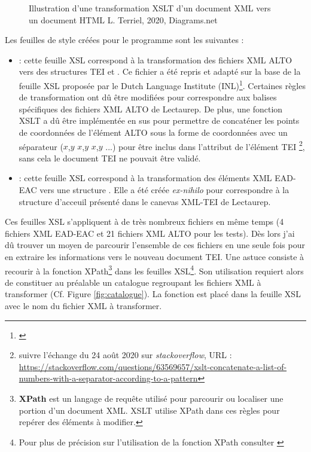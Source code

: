 \begin{figure}[h!]
    \centering
    \centerline{}
    \caption{Illustration d'une transformation XSLT d'un document XML vers un document HTML  \textcopyright L. Terriel, 2020, Diagrams.net}
    \label{fig:example_XSLT}
\end{figure}
\newpage
Les feuilles de style créées pour le programme sont les suivantes : 
\begin{itemize}
    \item {} : cette feuille XSL correspond à la transformation des fichiers XML ALTO vers des structures TEI  et . Ce fichier a été repris et adapté sur la base de la feuille XSL proposée par le Dutch Language Institute (INL)\footnote{\cite{dutch_language_institute_alto2tei_nodate}}. Certaines règles de transformation ont dû être modifiées pour correspondre aux balises spécifiques des fichiers XML ALTO de Lectaurep. De plus, une fonction XSLT a dû être implémentée en sus pour permettre de concaténer les points de coordonnées de l'élément ALTO  sous la forme de coordonnées avec un séparateur ($x$,$y$ $x$,$y$ $x$,$y$ ...)  pour être inclus dans l'attribut  de l'élément TEI \footnote{suivre l'échange du 24 août 2020 sur \textit{stackoverflow}, URL : \url{https://stackoverflow.com/questions/63569657/xslt-concatenate-a-list-of-numbers-with-a-separator-according-to-a-pattern}}, sans cela le document TEI ne pouvait être validé.\\ 
    \item {} : cette feuille XSL correspond à la transformation des éléments XML EAD-EAC vers une structure . Elle a été créée \textit{ex-nihilo} pour correspondre à la structure d'acceuil présenté dans le canevas XML-TEI de Lectaurep.  
\end{itemize}
\bigskip
Ces feuilles XSL s'appliquent à de très nombreux fichiers en même temps (4 fichiers XML EAD-EAC et 21 fichiers XML ALTO pour les tests). Dès lors j'ai dû trouver un moyen de parcourir l'ensemble de ces fichiers en une seule fois pour en extraire les informations vers le nouveau document TEI. Une astuce consiste à recourir à la fonction XPath\footnote{\textbf{XPath} est un langage de requête utilisé pour parcourir ou localiser une portion d'un document XML. XSLT utilise XPath dans ces règles pour repérer des éléments à modifier.}  dans les feuilles XSL\footnote{Pour plus de précision sur l'utilisation de la fonction XPath  consulter \cite{holmes_xpath_nodate-1}}. Son utilisation requiert alors de constituer au préalable un catalogue regroupant les fichiers XML à transformer (Cf. Figure \ref{fig:catalogue}). La fonction est placé dans la feuille XSL avec le nom du fichier XML  à transformer. 

